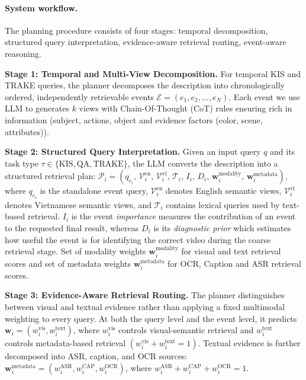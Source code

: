 \documentclass[runningheads]{llncs}
\begin{document}
\paragraph{System workflow.}
The planning procedure consists of four stages: temporal 
decomposition, structured query interpretation, evidence-aware retrieval routing, event-aware reasoning.


\textbf{Stage 1: Temporal and Multi-View Decomposition.} 
For temporal KIS and TRAKE queries, the planner decomposes the description into
chronologically ordered, independently retrievable events $
    \mathcal{E}
    =
    \left(
        e_1,e_2,\ldots,e_N
    \right)
$. Each event we use LLM to generates $k$ views with Chain-Of-Thought (CoT) rules ensuring rich in information (subject, actions, object and evidence factors (color, scene, attributes)).


\textbf{Stage 2: Structured Query Interpretation.}
Given an input query $q$ and its task type
$\tau \in \{\mathrm{KIS},\mathrm{QA},\mathrm{TRAKE}\}$, the LLM converts the description into a structured retrieval plan: $
    \mathcal{P}_i =
    \left(
        q_{e_i},\,
        \mathcal{V}^{\mathrm{en}}_i,\,
        \mathcal{V}^{\mathrm{vi}}_i,\,
        \mathcal{T}_i,\,
        I_i,\,
        D_i,\,
        \mathbf{w}^{\mathrm{modality}}_i,\,
        \mathbf{w}^{\mathrm{metadata}}_i
    \right)
$, where $q_{e_i}$ is the standalone event query,
$\mathcal{V}^{\mathrm{en}}_i$ denotes English semantic views,
$\mathcal{V}^{\mathrm{vi}}_i$ denotes Vietnamese semantic views, and $\mathcal{T}_i$ contains lexical queries used by text-based
retrieval. $I_i$ is the event \emph{importance} measures the contribution of an event to the requested
final result, whereas $D_i$ is its \emph{diagnostic prior} which estimates how useful the event is for
identifying the correct video during the coarse retrieval stage. Set of modality weights $\mathbf{w}^{\mathrm{modality}}_i$ for visual and text retrieval scores and set of metadata weights $\mathbf{w}^{\mathrm{metadata}}_i$ for OCR, Caption and ASR retrieval scores.

\textbf{Stage 3: Evidence-Aware Retrieval Routing.}
The planner distinguishes between visual and textual evidence rather than
applying a fixed multimodal weighting to every query. At both the query level
and the event level, it predicts $
    \mathbf{w}_i =
    \left(
        w_i^{\mathrm{vis}},
        w_i^{\mathrm{text}}
    \right)
$,
where $w_i^{\mathrm{vis}}$ controls visual-semantic retrieval and
$w_i^{\mathrm{text}}$ controls metadata-based retrieval $(w_i^{\mathrm{vis}} + w_i^{\mathrm{text}} = 1)$. Textual evidence is further decomposed into ASR, caption, and OCR sources: $
    \mathbf{w}^{\mathrm{metadata}}_i =
    \left(
        w_i^{\mathrm{ASR}},
        w_i^{\mathrm{CAP}},
        w_i^{\mathrm{OCR}}
    \right)$, where $
    w_i^{\mathrm{ASR}}
    + w_i^{\mathrm{CAP}}
    + w_i^{\mathrm{OCR}}
    = 1$.
\end{document}
